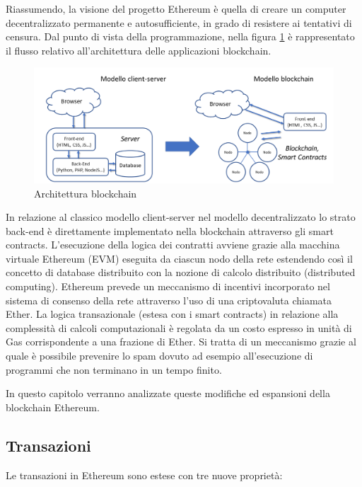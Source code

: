 Riassumendo, la visione del progetto Ethereum è quella di creare un computer decentralizzato permanente e autosufficiente, in grado di resistere ai tentativi di censura. Dal punto di vista della programmazione, nella figura \ref{fig:ArchitetturaBlockchain} è rappresentato il flusso relativo all’architettura delle applicazioni blockchain.

\begin{figure}[H]
\centering
\includegraphics[width=1\textwidth]{immagini/architetturav1.png}
\caption{Architettura blockchain}
\label{fig:ArchitetturaBlockchain}
\end{figure}

In relazione al classico modello client-server nel modello decentralizzato lo strato back-end è direttamente implementato nella blockchain attraverso gli smart contracts. L’esecuzione della logica dei contratti avviene grazie alla macchina virtuale Ethereum (EVM) eseguita da ciascun nodo della rete estendendo così il concetto di database distribuito con la nozione di calcolo distribuito (distributed computing). Ethereum prevede un meccanismo di incentivi incorporato nel sistema di consenso della rete attraverso l’uso di una criptovaluta chiamata Ether. La logica transazionale (estesa con i smart contracts) in relazione alla complessità di calcoli computazionali è regolata da un costo espresso in unità di Gas corrispondente a una frazione di Ether. Si tratta di un meccanismo grazie al quale è possibile prevenire lo spam dovuto ad esempio all’esecuzione di programmi che non terminano in un tempo finito.

In questo capitolo verranno analizzate queste modifiche ed espansioni della blockchain Ethereum.

\subsection{Transazioni}

Le transazioni in Ethereum sono estese con tre nuove proprietà:

